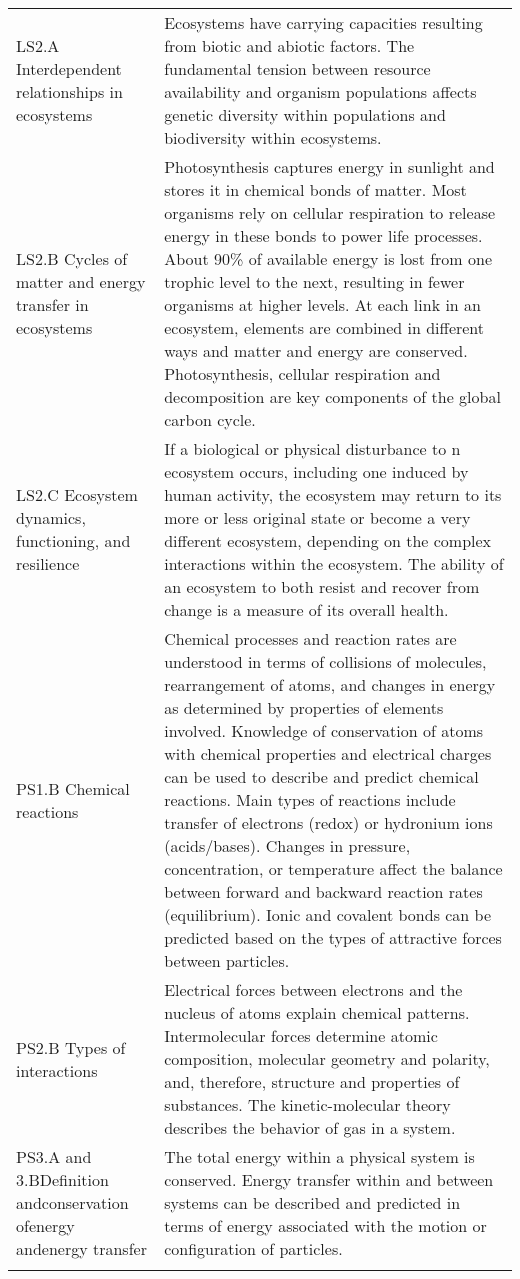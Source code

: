 \documentclass[
]{article}
\begin{document}
\begin{longtable}[]{@{}
  >{\raggedright\arraybackslash}p{}
  >{\raggedright\arraybackslash}p{}@{}}
LS2.A Interdependent relationships in ecosystems & Ecosystems have
carrying capacities resulting from biotic and abiotic factors. The
fundamental tension between resource availability and organism
populations affects genetic diversity within populations and
biodiversity within ecosystems. \\
LS2.B Cycles of matter and energy transfer in ecosystems &
Photosynthesis captures energy in sunlight and stores it in chemical
bonds of matter. Most organisms rely on cellular respiration to release
energy in these bonds to power life processes. About 90\% of available
energy is lost from one trophic level to the next, resulting in fewer
organisms at higher levels. At each link in an ecosystem, elements are
combined in different ways and matter and energy are conserved.
Photosynthesis, cellular respiration and decomposition are key
components of the global carbon cycle. \\
LS2.C Ecosystem dynamics, functioning, and resilience & If a biological
or physical disturbance to n ecosystem occurs, including one induced by
human activity, the ecosystem may return to its more or less original
state or become a very different ecosystem, depending on the complex
interactions within the ecosystem. The ability of an ecosystem to both
resist and recover from change is a measure of its overall health. \\
PS1.B Chemical reactions & Chemical processes and reaction rates are
understood in terms of collisions of molecules, rearrangement of atoms,
and changes in energy as determined by properties of elements involved.
Knowledge of conservation of atoms with chemical properties and
electrical charges can be used to describe and predict chemical
reactions. Main types of reactions include transfer of electrons (redox)
or hydronium ions (acids/bases). Changes in pressure, concentration, or
temperature affect the balance between forward and backward reaction
rates (equilibrium). Ionic and covalent bonds can be predicted based on
the types of attractive forces between particles. \\
PS2.B Types of interactions & Electrical forces between electrons and
the nucleus of atoms explain chemical patterns. Intermolecular forces
determine atomic composition, molecular geometry and polarity, and,
therefore, structure and properties of substances. The kinetic-molecular
theory describes the behavior of gas in a system. \\
PS3.A and 3.BDefinition andconservation ofenergy andenergy transfer &
The total energy within a physical system is conserved. Energy transfer
within and between systems can be described and predicted in terms of
energy associated with the motion or configuration of particles. \\
& \\
\bottomrule
\end{longtable}
\end{document}
